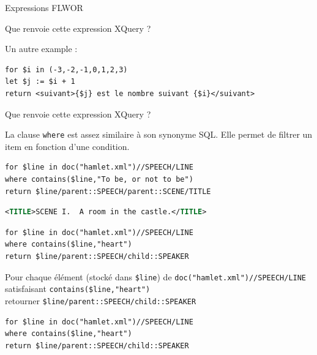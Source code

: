 \begin{frame}{Expressions FLWOR }
\begin{exoblock}
Que renvoie cette expression XQuery ?
\end{exoblock}
\framebreak

Un autre example :

\begin{lstlisting}
for $i in (-3,-2,-1,0,1,2,3)
let $j := $i + 1
return <suivant>{$j} est le nombre suivant {$i}</suivant>
\end{lstlisting}

\begin{exoblock}
Que renvoie cette expression XQuery ?
\end{exoblock}


\framebreak

La clause \lstinline!where! est assez similaire à son synonyme SQL. Elle permet de filtrer un item en fonction d'une condition.

\bigskip

\begin{lstlisting}
for $line in doc("hamlet.xml")//SPEECH/LINE
where contains($line,"To be, or not to be")
return $line/parent::SPEECH/parent::SCENE/TITLE
\end{lstlisting}


\begin{lstlisting}[language=XML]
<TITLE>SCENE I.  A room in the castle.</TITLE>
\end{lstlisting}

\framebreak 

\begin{lstlisting}
for $line in doc("hamlet.xml")//SPEECH/LINE
where contains($line,"heart")
return $line/parent::SPEECH/child::SPEAKER
\end{lstlisting}

\medskip
 
Pour chaque élément (stocké dans \lstinline!$line!) de \lstinline!doc("hamlet.xml")//SPEECH/LINE! \\
satisfaisant \lstinline!contains($line,"heart")! \\
retourner \lstinline!$line/parent::SPEECH/child::SPEAKER!

\framebreak

\begin{lstlisting}
for $line in doc("hamlet.xml")//SPEECH/LINE
where contains($line,"heart")
return $line/parent::SPEECH/child::SPEAKER
\end{lstlisting}


\end{frame}
